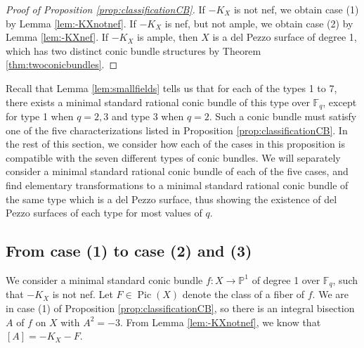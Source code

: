 \documentclass[a4paper, 11pt, reqno]{amsart}
\numberwithin{equation}{section} \numberwithin{figure}{section}
\DeclareMathOperator{\Pic}{Pic}
\def \F {{\mathbb F}}
\def \P {{\mathbb P}}
\newcommand{\ra}{\rightarrow}
\theoremstyle{definition}
\numberwithin{lemma}{section}
\begin{document}
\begin{proof}[Proof of Proposition \ref{prop:classificationCB}]
    If $-K_X$ is not nef, we obtain case (1) by Lemma \ref{lem:-KXnotnef}. If $-K_X$ is nef, but not ample, we obtain case (2) by Lemma \ref{lem:-KXnef}. If $-K_X$ is ample, then $X$ is a del Pezzo surface of degree 1, which has two distinct conic bundle structures by Theorem \ref{thm:twoconicbundles}.
\end{proof}

Recall that Lemma \ref{lem:smallfields} tells us that for each of the types 1 to 7, there exists a minimal standard rational conic bundle of this type over $\F_q$, except for type 1 when $q = 2, 3$ and type 3 when $q = 2$. Such a conic bundle must satisfy one of the five characterizations listed in Proposition \ref{prop:classificationCB}. In the rest of this section, we consider how each of the cases in this proposition is compatible with the seven different types of conic bundles. We will separately consider a minimal standard rational conic bundle of each of the five cases, and find elementary transformations to a minimal standard rational conic bundle of the same type which is a del Pezzo surface, thus showing the existence of del Pezzo surfaces of each type for most values of $q$.



\subsection{From case (1) to case (2) and (3)}\label{sec:case(1)}
We consider a minimal standard conic bundle $f \colon X \ra \P^1$ of degree 1 over $\F_q$, such that $-K_X$ is not nef. Let $F \in \Pic(X)$ denote the class of a fiber of $f$. We are in case (1) of Proposition \ref{prop:classificationCB}, so there is an integral bisection $A$ of $f$ on $X$ with $A^2 = -3$. From Lemma \ref{lem:-KXnotnef}, we know that $[A] = -K_X - F$.

\end{document}
